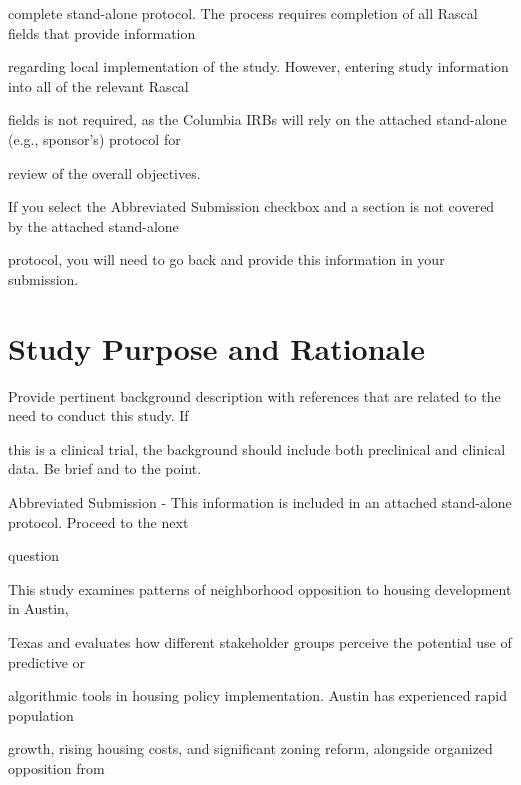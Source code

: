\documentclass[10pt, letterpaper]{article}
\begin{document}
\vspace{0.5em}

complete stand-alone protocol. The process requires completion of all Rascal fields that provide information

regarding local implementation of the study. However, entering study information into all of the relevant Rascal

fields is not required, as the Columbia IRBs will rely on the attached stand-alone (e.g., sponsor's) protocol for

review of the overall objectives.

If you select the Abbreviated Submission checkbox and a section is not covered by the attached stand-alone

protocol, you will need to go back and provide this information in your submission.

\vspace{0.5em}

\vspace{0.5em}

\section*{Study Purpose and Rationale}

Provide pertinent background description with references that are related to the need to conduct this study. If

this is a clinical trial, the background should include both preclinical and clinical data. Be brief and to the point.

\noindent \makebox[0pt][l]{$\square$}\hspace{1.2em} Abbreviated Submission - This information is included in an attached stand-alone protocol. Proceed to the next

\begin{responsebox}

question

This study examines patterns of neighborhood opposition to housing development in Austin,

\end{responsebox}

Texas and evaluates how different stakeholder groups perceive the potential use of predictive or

algorithmic tools in housing policy implementation. Austin has experienced rapid population

growth, rising housing costs, and significant zoning reform, alongside organized opposition from
\end{document}
